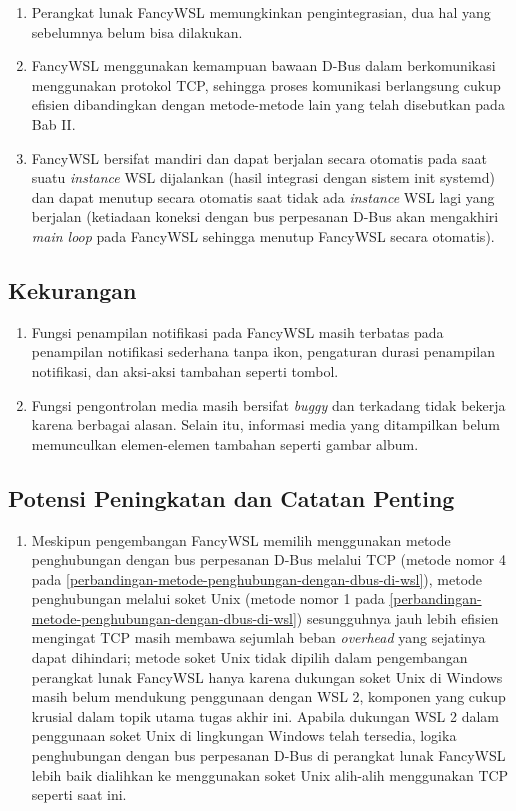\begin{enumerate}
    \item Perangkat lunak FancyWSL memungkinkan pengintegrasian, dua hal yang sebelumnya belum bisa dilakukan.
    \item FancyWSL menggunakan kemampuan bawaan D-Bus dalam berkomunikasi menggunakan protokol TCP, sehingga proses komunikasi berlangsung cukup efisien dibandingkan dengan metode-metode lain yang telah disebutkan pada Bab II.
    \item FancyWSL bersifat mandiri dan dapat berjalan secara otomatis pada saat suatu \textit{instance} WSL dijalankan (hasil integrasi dengan sistem init systemd) dan dapat menutup secara otomatis saat tidak ada \textit{instance} WSL lagi yang berjalan (ketiadaan koneksi dengan bus perpesanan D-Bus akan mengakhiri \textit{main loop} pada FancyWSL sehingga menutup FancyWSL secara otomatis).
\end{enumerate}

\subsection{Kekurangan}

\begin{enumerate}
    \item Fungsi penampilan notifikasi pada FancyWSL masih terbatas pada penampilan notifikasi sederhana tanpa ikon, pengaturan durasi penampilan notifikasi, dan aksi-aksi tambahan seperti tombol.

    \item Fungsi pengontrolan media masih bersifat \textit{buggy} dan terkadang tidak bekerja karena berbagai alasan. Selain itu, informasi media yang ditampilkan belum memunculkan elemen-elemen tambahan seperti gambar album.
\end{enumerate}

\subsection{Potensi Peningkatan dan Catatan Penting}

\begin{enumerate}
    \item Meskipun pengembangan FancyWSL memilih menggunakan metode penghubungan dengan bus perpesanan D-Bus melalui TCP (metode nomor 4 pada \autoref{perbandingan-metode-penghubungan-dengan-dbus-di-wsl}), metode penghubungan melalui soket Unix (metode nomor 1 pada \autoref{perbandingan-metode-penghubungan-dengan-dbus-di-wsl}) sesungguhnya jauh lebih efisien mengingat TCP masih membawa sejumlah beban \textit{overhead} yang sejatinya dapat dihindari; metode soket Unix tidak dipilih dalam pengembangan perangkat lunak FancyWSL hanya karena dukungan soket Unix di Windows masih belum mendukung penggunaan dengan WSL 2, komponen yang cukup krusial dalam topik utama tugas akhir ini. Apabila dukungan WSL 2 dalam penggunaan soket Unix di lingkungan Windows telah tersedia, logika penghubungan dengan bus perpesanan D-Bus di perangkat lunak FancyWSL lebih baik dialihkan ke menggunakan soket Unix alih-alih menggunakan TCP seperti saat ini.
\end{enumerate}
